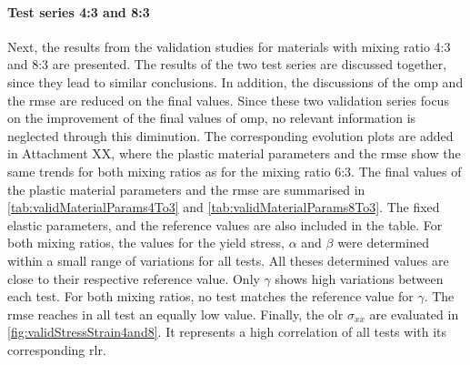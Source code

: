 \paragraph{Test series 4:3 and 8:3}
Next, the results from the validation studies for materials with mixing ratio 4:3 and 8:3 are presented. The results of the two test series are discussed together, since they lead to similar conclusions. In addition, the discussions of the \acrlong{omp} and the \acrshort{rmse} are reduced on the final values.  Since these two validation series focus on the improvement of the final values of \acrlong{omp}, no relevant information is neglected through this diminution. The corresponding evolution plots are added in Attachment XX, where the plastic material parameters and the \acrshort{rmse} show the same trends for both mixing ratios as for the mixing ratio 6:3. The final values of the plastic material parameters and the \acrshort{rmse} are summarised in \autoref{tab:validMaterialParams4To3} and \autoref{tab:validMaterialParams8To3}. The fixed elastic parameters, and the reference values are also included in the table.
For both mixing ratios, the values for the yield stress, $\alpha$ and $\beta$ were determined within a small range of variations for all tests. All theses determined values are close to their respective reference value.
Only $\gamma$ shows high variations between each test. For both mixing ratios, no test matches the reference value for $\gamma$. The \acrshort{rmse} reaches in all test an equally low value. Finally, the \acrlong{olr} $\sigma_{xx}$ are evaluated in \autoref{fig:validStressStrain4and8}. It represents a high correlation of all tests with its corresponding \acrlong{rlr}.

